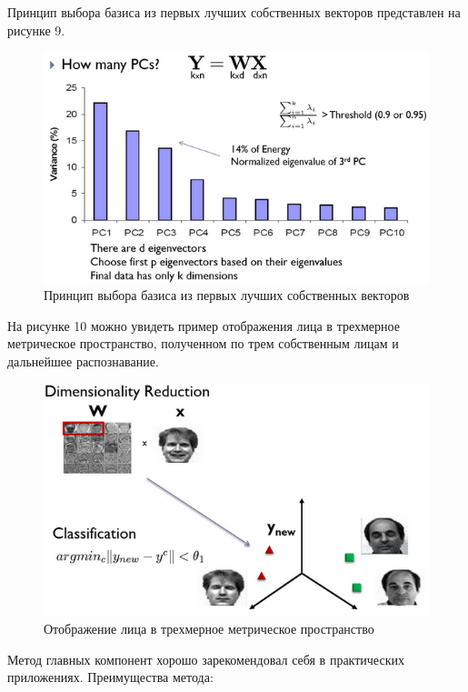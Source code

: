 \documentclass[12pt,a4paper]{article}					%
\begin{document}
Принцип выбора базиса из первых лучших собственных векторов представлен на рисунке 9.

\begin{figure}[h!]
\centering
\includegraphics[scale=0.70]{res/pick_bases}
\caption{Принцип выбора базиса из первых лучших собственных векторов}
\end{figure}

На рисунке 10 можно увидеть пример отображения лица в трехмерное метрическое пространство, полученном по трем собственным лицам и дальнейшее распознавание.

\begin{figure}[h!]
\centering
\includegraphics[scale=0.70]{res/pick_bases_ex}
\caption{Отображение лица в трехмерное метрическое пространство}
\end{figure}

Метод главных компонент хорошо зарекомендовал себя в практических приложениях.
Преимущества метода:
\end{document}
